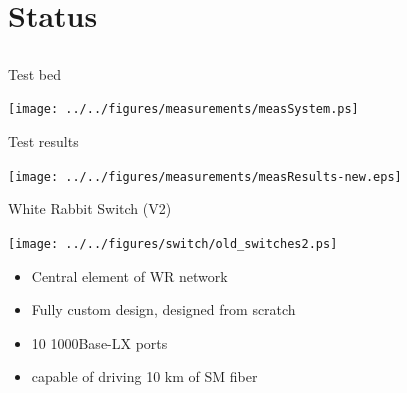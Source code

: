 \documentclass[compress,red]{beamer}
\begin{document}
\section{Status}
\subsection{}
\begin{frame}{Test bed}

    \begin{center}
    \texttt{[image: ../../figures/measurements/measSystem.ps]}
    \end{center}

\end{frame}
\begin{frame}{Test results}

    \begin{center}
    \texttt{[image: ../../figures/measurements/measResults-new.eps]}
    \end{center}


\end{frame}
\begin{frame}{White Rabbit Switch (V2)}

    \begin{center}
    \texttt{[image: ../../figures/switch/old\_switches2.ps]}
    \end{center}

	\begin{itemize}
	\item Central element of WR network
	\item Fully custom design, designed from scratch
	\item 10 1000Base-LX ports
	\item capable of driving 10 km of SM fiber
	\end{itemize}




\end{frame}
\end{document}
